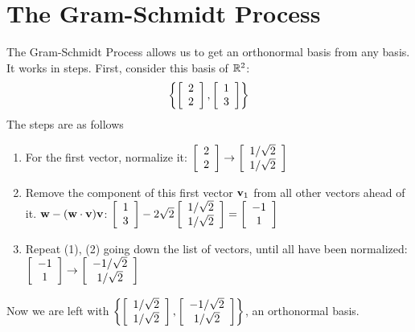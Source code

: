 \documentclass{article}
\begin{document}
    \section{The Gram-Schmidt Process}
    The Gram-Schmidt Process allows us to get an orthonormal basis from any basis. It works in steps. First, consider this basis of $\mathbb{R}^2$:
    \[\left\{\left[\begin{array}{c}2 \\ 2\end{array}\right], \left[\begin{array}{c}1 \\ 3\end{array}\right]\right\}\]
    The steps are as follows
    \begin{enumerate}
        \item For the first vector, normalize it: $\left[\begin{array}{c}2 \\ 2\end{array}\right] \to \left[\begin{array}{c}1/\sqrt{2} \\ 1/\sqrt{2}\end{array}\right]$
        \item Remove the component of this first vector $\mathbf{v}_1$ from all other vectors ahead of it. $\mathbf{w} - (\mathbf{w} \cdot \mathbf{v})\mathbf{v}$: $\left[\begin{array}{c}1 \\ 3\end{array}\right] - 2\sqrt{2}\left[\begin{array}{c}1/\sqrt{2} \\ 1/\sqrt{2}\end{array}\right] = \left[\begin{array}{c}-1 \\ 1\end{array}\right]$
        \item Repeat (1), (2) going down the list of vectors, until all have been normalized: $\left[\begin{array}{c}-1 \\ 1\end{array}\right] \to \left[\begin{array}{c}-1/\sqrt{2} \\ 1/\sqrt{2}\end{array}\right]$
    \end{enumerate}
    
    Now we are left with $\left\{\left[\begin{array}{c}1/\sqrt{2} \\ 1/\sqrt{2}\end{array}\right], \left[\begin{array}{c}-1/\sqrt{2} \\ 1/\sqrt{2}\end{array}\right]\right\}$, an orthonormal basis.
\end{document}
